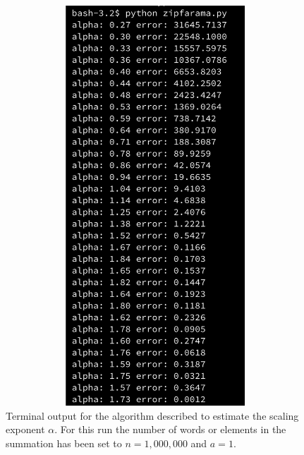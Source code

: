 \documentclass{article}
\begin{document}
\begin{figure}[h]
\includegraphics[height=15cm,width=15cm,keepaspectratio]{Q03/zipfaramaOutput.png}
\caption{Terminal output for the algorithm described to estimate the scaling exponent $\alpha$. For this run the number of words or elements in the summation has been set to $n = 1,000,000$ and $a = 1$. }
\label{fig:envelope}
\end{figure}
\end{document}
